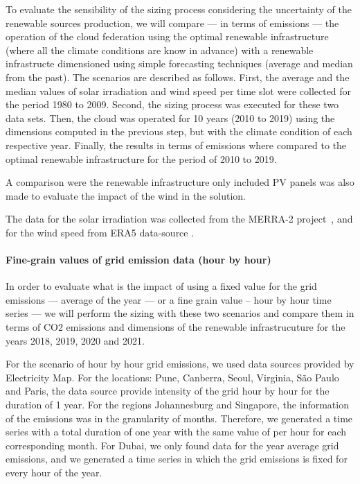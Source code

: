 To evaluate the sensibility of the sizing process considering the uncertainty of the renewable sources production, we will compare --- in terms of  emissions ---  the operation of the cloud federation using the optimal renewable infrastructure (where all the climate conditions are know in advance) with a renewable infrastructe dimensioned using simple forecasting techniques (average and median from the past). The scenarios are described as follows. First, the average and the median values of solar irradiation and wind speed per time slot were collected for the period 1980 to 2009. Second, the sizing process was executed for these two data sets. Then, the cloud was operated for 10 years (2010 to 2019) using the dimensions computed in the previous step, but with the climate condition of each respective year. Finally, the results in terms of  emissions where compared to the optimal renewable infrastructure for the period of 2010 to 2019.

A comparison were the renewable infrastructure only included PV panels was also made to evaluate the impact of the wind in the solution.

The data for the solar irradiation was collected from the MERRA-2 project~\cite{GELARO2017MERRA2}, and for the wind speed from ERA5 data-source \cite{era5_wind_2022}.

\paragraph{Fine-grain values of grid emission data (hour by hour)}

In order to evaluate what is the impact of using a fixed value for the grid emissions --- average of the year ---  or a fine grain value --  hour by  hour time series ---  we will perform the sizing with these two scenarios and compare them in terms of CO2 emissions and dimensions of the renewable infrastrucuture for the years 2018, 2019, 2020 and 2021.

For the scenario of hour by hour grid emissions, we used data sources provided by Electricity Map. For the locations: Pune, Canberra, Seoul, Virginia, São Paulo and Paris, the data source provide  intensity of the grid hour by hour for the duration of 1 year. For the regions Johannesburg and Singapore, the information of the  emissions was in the granularity of months. Therefore, we generated a time series with a total duration of one year with the same value of  per hour for each corresponding month. For Dubai, we only found data for the year average grid  emissions, and we generated a time series in which the grid emissions is fixed for every hour of the year.


